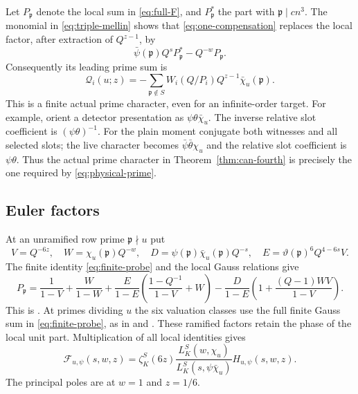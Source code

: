 \documentclass[11pt,a4paper]{article}
\numberwithin{equation}{section}
\theoremstyle{definition}
\theoremstyle{remark}
\begin{document}
Let $P_{\mathfrak p}$ denote the local sum in \eqref{eq:full-F}, and
$P_{\mathfrak p}^*$ the part with $\mathfrak p\mid cn^3$.
The monomial in \eqref{eq:triple-mellin} shows that
\eqref{eq:one-compensation} replaces the local factor, after extraction of
$Q^{z-1}$, by
\[
 \bar\psi(\mathfrak p)Q^sP_{\mathfrak p}^*-Q^{-w}P_{\mathfrak p}.
\]
Consequently its leading prime sum is
\begin{equation}\label{eq:physical-prime}
 \mathcal Q_i(u;z)=-\sum_{\mathfrak p\notin S}
       W_i(Q/P_i)Q^{z-1}\bar\chi_u(\mathfrak p).
\end{equation}
This is a finite actual prime character, even for an infinite-order target.
For example, orient a detector presentation as $\psi\theta\bar\chi_u$.
The inverse relative slot coefficient is $(\psi\theta)^{-1}$.
For the plain moment conjugate both witnesses and all selected slots;
the live character becomes $\bar\psi\bar\theta\chi_u$ and the relative
slot coefficient is $\psi\theta$.  Thus the actual prime character in
Theorem~\ref{thm:can-fourth} is precisely the one required by
\eqref{eq:physical-prime}.  

\subsection{Euler factors}

At an unramified row prime $\mathfrak p\nmid u$ put
\[
 V=Q^{-6z},\quad W=\chi_u(\mathfrak p)Q^{-w},\quad
 D=\psi(\mathfrak p)\bar\chi_u(\mathfrak p)Q^{-s},\quad
 E=\vartheta(\mathfrak p)^6Q^{4-6s}V.
\]
The finite identity \eqref{eq:finite-probe} and the local Gauss relations give
\begin{equation}\label{eq:unramified-P}
 P_{\mathfrak p}=
 \frac1{1-V}+\frac{W}{1-W}
 +\frac{E}{1-E}\left(\frac{1-Q^{-1}}{1-V}+W\right)
 -\frac{D}{1-E}\left(1+\frac{(Q-1)WV}{1-V}\right).
\end{equation}
This is \cite[equation~(7.19)]{P}.  At primes dividing $u$ the six valuation classes
use the full finite Gauss sum in \eqref{eq:finite-probe}, as in
\cite[equations~(7.21)--(7.22)]{P} and \cite[Lemma~7.1]{Q}.
These ramified factors retain the phase of the local unit part.
Multiplication of all local identities gives
\begin{equation}\label{eq:factorization}
 \mathscr F_{u,\psi}(s,w,z)=
 \zeta_K^S(6z)\frac{L_K^S(w,\chi_u)}{L_K^S(s,\psi\bar\chi_u)}
          H_{u,\psi}(s,w,z).
\end{equation}
The principal poles are at $w=1$ and $z=1/6$.
\end{document}
